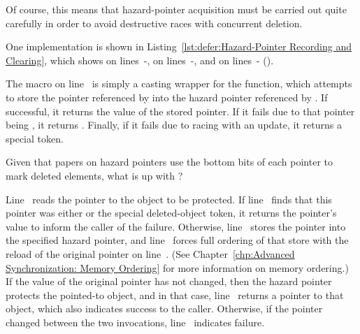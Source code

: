 Of course, this means that hazard-pointer acquisition must be carried
out quite carefully in order to avoid destructive races with concurrent
deletion.
\begin{lineref}
One implementation is shown in
Listing~\ref{lst:defer:Hazard-Pointer Recording and Clearing},
which shows  on lines~-,
 on lines~-, and
 on
lines~- ().

The  macro on line~ is simply a casting
wrapper for the  function, which attempts to store
the pointer referenced by  into the hazard pointer referenced
by .
If successful, it returns the value of the stored pointer.
If it fails due to that pointer being , it returns .
Finally, if it fails due to racing with an update, it returns a special
 token.

\QuickQuiz{}
	Given that papers on hazard pointers use the bottom bits
	of each pointer to mark deleted elements, what is up with
	?
 \QuickQuizEnd

Line~ reads the pointer to the object to be protected.
If line~ finds that this pointer was either  or
the special  deleted-object token, it returns
the pointer's value to inform the caller of the failure.
Otherwise, line~ stores the pointer into the specified
hazard pointer, and line~ forces full ordering of that
store with the reload of the original pointer on line~.
(See Chapter~\ref{chp:Advanced Synchronization: Memory Ordering}
for more information on memory ordering.)
If the value of the original pointer has not changed, then the hazard
pointer protects the pointed-to object, and in that case,
line~ returns a pointer to that object, which also
indicates success to the caller.
Otherwise, if the pointer changed between the two 
invocations, line~ indicates failure.


\end{lineref}
